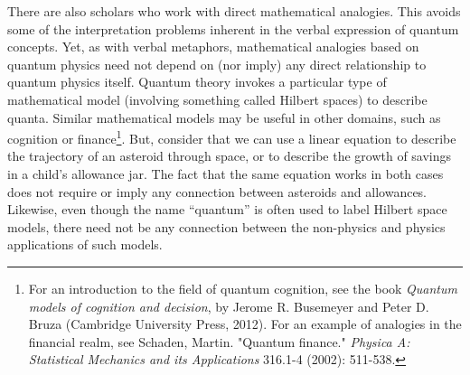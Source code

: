 \documentclass[onecolumn,preprintnumbers,amsmath,amssymbn,reprint,nofootinbib,superscriptaddress]{revtex4}    %
\begin{document}
There are also scholars who work with direct mathematical analogies.  This avoids some of the interpretation problems inherent in the verbal expression of quantum concepts. Yet, as with verbal metaphors, mathematical analogies based on quantum physics need not depend on (nor imply) any direct relationship to quantum physics itself. Quantum theory invokes a particular type of mathematical model (involving something called Hilbert spaces) to describe quanta. Similar mathematical models may be useful in other domains, such as cognition or finance\footnote{For an introduction to the field of quantum cognition, see the book   {\em{Quantum models of cognition and decision}}, by Jerome R. Busemeyer and Peter D. Bruza (Cambridge University Press, 2012).  For an example of analogies in the financial realm, see Schaden, Martin. "Quantum finance." {\em{Physica A: Statistical Mechanics and its Applications}} 316.1-4 (2002): 511-538.}.  But, consider that we can use a linear equation to describe the trajectory of an asteroid through space, or to describe the growth of savings in a child's allowance jar.  The fact that the same equation works in both cases does not require or imply any connection between asteroids and allowances.  Likewise, even though the name ``quantum'' is often used to label Hilbert space models, there need not be any connection between the non-physics and physics applications of such models.


 
\end{document}
